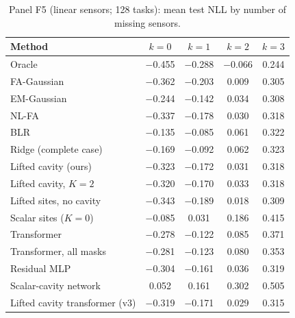 \begin{table}[h]
\centering\small
\caption{\label{tab:moreF5}Panel F5 (linear sensors; 128 tasks): mean test NLL by number of missing sensors.}
\begin{tabular}{lcccc}
\toprule
Method & $k{=}0$ & $k{=}1$ & $k{=}2$ & $k{=}3$\\
\midrule
Oracle & $-$0.455 & $-$0.288 & $-$0.066 & 0.244\\
FA-Gaussian & $-$0.362 & $-$0.203 & 0.009 & 0.305\\
EM-Gaussian & $-$0.244 & $-$0.142 & 0.034 & 0.308\\
NL-FA & $-$0.337 & $-$0.178 & 0.030 & 0.318\\
BLR & $-$0.135 & $-$0.085 & 0.061 & 0.322\\
Ridge (complete case) & $-$0.169 & $-$0.092 & 0.062 & 0.323\\
Lifted cavity (ours) & $-$0.323 & $-$0.172 & 0.031 & 0.318\\
Lifted cavity, $K=2$ & $-$0.320 & $-$0.170 & 0.033 & 0.318\\
Lifted sites, no cavity & $-$0.343 & $-$0.189 & 0.018 & 0.309\\
Scalar sites ($K=0$) & $-$0.085 & 0.031 & 0.186 & 0.415\\
Transformer & $-$0.278 & $-$0.122 & 0.085 & 0.371\\
Transformer, all masks & $-$0.281 & $-$0.123 & 0.080 & 0.353\\
Residual MLP & $-$0.304 & $-$0.161 & 0.036 & 0.319\\
Scalar-cavity network & 0.052 & 0.161 & 0.302 & 0.505\\
Lifted cavity transformer (v3) & $-$0.319 & $-$0.171 & 0.029 & 0.315\\
\bottomrule
\end{tabular}
\end{table}

